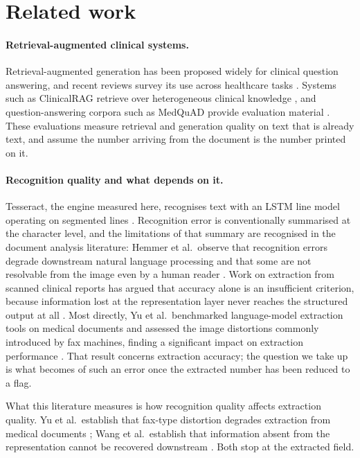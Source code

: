 \documentclass[11pt]{article}
\begin{document}
\section{Related work}

\paragraph{Retrieval-augmented clinical systems.}
Retrieval-augmented generation has been proposed widely for clinical question answering, and
recent reviews survey its use across healthcare tasks \citep{gao2023rag,amugongo2025rag}.
Systems such as ClinicalRAG retrieve over heterogeneous clinical knowledge
\citep{lu2024clinicalrag}, and question-answering corpora such as MedQuAD provide evaluation
material \citep{benabacha2019medquad}. These evaluations measure retrieval and generation
quality on text that is already text, and assume the number arriving from the document is the
number printed on it.

\paragraph{Recognition quality and what depends on it.}
Tesseract, the engine measured here, recognises text with an LSTM line model operating on
segmented lines \citep{smith2007tesseract}. Recognition error is conventionally summarised at
the character level, and the limitations of that summary are recognised in the document analysis
literature: Hemmer et al.\ observe that recognition errors degrade downstream natural language
processing and that some are not resolvable from the image even by a human reader
\citep{hemmer2024confidence}. Work on extraction from scanned clinical reports has argued that
accuracy alone is an insufficient criterion, because information lost at the representation
layer never reaches the structured output at all \citep{wang2026keycoverage}. Most directly, Yu et al.\ benchmarked
language-model extraction tools on medical documents and assessed the image distortions
commonly introduced by fax machines, finding a significant impact on extraction performance
\citep{yu2026benchmark}. That result concerns extraction accuracy; the question we take up is
what becomes of such an error once the extracted number has been reduced to a flag.

What this literature measures is how recognition quality affects extraction quality. Yu et al.\
establish that fax-type distortion degrades extraction from medical documents
\citep{yu2026benchmark}; Wang et al.\ establish that information absent from the representation
cannot be recovered downstream \citep{wang2026keycoverage}. Both stop at the extracted field.
\end{document}
